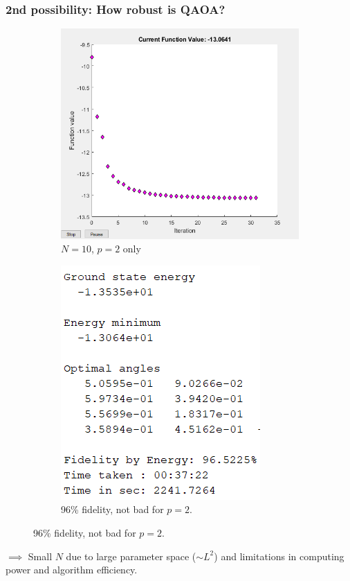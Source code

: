 \documentclass{beamer}
\theoremstyle{definition}
\begin{document}


\begin{frame}
\frametitle{2nd possibility: How robust is QAOA?}





\begin{figure}[!htb]
	\centering
	\begin{subfigure}{0.5 \textwidth}
		\centering
		\includegraphics[scale=0.30]{N_10_p_2.PNG}
		\caption{$N=10$, $p=2$ only}
	\end{subfigure}%
	\begin{subfigure}{0.5 \textwidth}
		\centering
		\includegraphics[scale=0.47]{N_10_p_2_out}
		\caption{96\% fidelity, not bad for $p=2$.}
	\end{subfigure}
\end{figure}



$\implies$ Small $N$ due to large parameter space ($\sim L^2$) and limitations in computing power and algorithm efficiency.











\end{frame}
\end{document}

